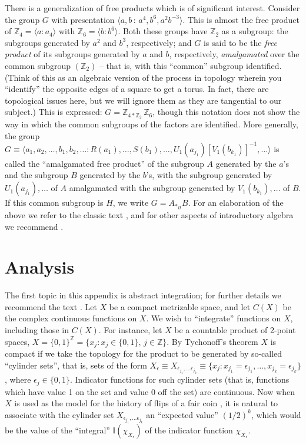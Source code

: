 \documentclass[reqno]{stml-l}
\theoremstyle{plain}
\theoremstyle{definition}
\numberwithin{equation}{chapter}
\begin{document}
There is a generalization of free products which is of significant interest. Consider the group $G$ with presentation $\langle a,b\,:\,a^{4},b^{6}, a^{2}b^{-3}\rangle$. This is almost the free product of $\mathbb{Z}_{4}=\langle a: a_{4}\rangle$ with $\mathbb{Z}_{6}=\langle b: b^{6}\rangle$. Both these groups have $\mathbb{Z}_{2}$ as a subgroup: the subgroups generated by $a^{2}$ and $b^{3}$, respectively; and $G$ is said to be the \emph{free product} of its subgroups generated by $a$ and $b$, respectively, \emph{amalgamated} over the common subgroup $(\mathbb{Z}_{2})$ -- that is, with this ``common'' subgroup identified. (Think of this as an algebraic version of the process in topology wherein you ``identify'' the opposite edges of a square to get a torus. In fact, there are topological issues here, but we will ignore them as they are tangential to our subject.) This is expressed: $G=\mathbb{Z}_{4\ast \mathbb{Z}_{2}}\,\mathbb{Z}_{6}$, though this notation does not show the way in which the common subgroups of the factors are identified. More generally, the group $G\equiv \langle a_{1},a_{2},\ldots,b_{1},b_{2},\ldots:R(a_{1}),\ldots,S(b_{1}),\ldots,U_{1}(a_{j_{1}})[V_{1}(b_{k_{1}})]^{-1},\ldots\rangle$ is called the ``amalgamated free product'' of the subgroup $A$ generated by the $a$'s and the subgroup $B$ generated by the $b$'s, with the subgroup generated by $U_{1}(a_{j_{1}}),\ldots$ of $A$ amalgamated with the subgroup generated by $V_{1}(b_{k_{1}}),\ldots$ of $B$. If this common subgroup is $H$, we write $G=A_{\ast_{H}} B$. For an elaboration of the above we refer to the classic text \cite{bib:MKS}, and for other aspects of introductory algebra we recommend \cite{bib:Her}.

\chapter{Analysis}\label{appIII:appIII}

The first topic in this appendix is abstract integration; for further details we recommend the text \cite{bib:Tay}. Let $X$ be a compact metrizable space, and let $C(X)$ be the complex continuous functions on $X$. We wish to ``integrate'' functions on $X$, including those in $C(X)$. For instance, let $X$ be a countable product of 2-point spaces, $X=\{0,1\}^{\mathbb{Z}}= \{x_{j}:x_{j}\in\{0,1\},\,j\in \mathbb{Z}\}$. By Tychonoff's theorem $X$ is compact if we take the topology for the product to be generated by so-called ``cylinder sets'', that is, sets of the form $X_{\epsilon}\equiv X_{\epsilon_{j_{1}},\ldots\epsilon_{j_{k}}}\equiv\{x_{j}:x_{j_{1}}= \epsilon_{j_{1}},\ldots,x_{j_{k}}=\epsilon_{j_{k}}\}$, where $\epsilon_{j}\in\{0,1\}$. Indicator functions for such cylinder sets (that is, functions which have value 1 on the set and value $0$ off the set) are continuous. Now when $X$ is used as the model for the history of flips of a fair coin \cite{bib:Bil}, it is natural to associate with the cylinder set $X_{\epsilon_{j_{1}},\ldots\epsilon_{j_{k}}}$ an ``expected value'' $(1/2)^{k}$, which would be the value of the ``integral'' $\mathbb{I}(\chi_{X_{\epsilon}})$ of the indicator function $\chi_{X_{\epsilon}}$.
\end{document}
